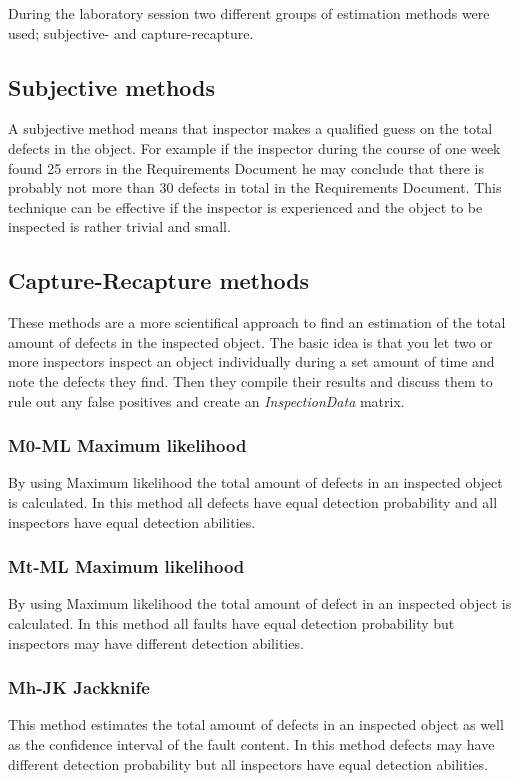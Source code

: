 During the laboratory session two different groups of estimation methods were used; subjective- and capture-recapture.

\subsection{Subjective methods}
A subjective method means that inspector makes a qualified guess on the total defects in the object. 
For example if the inspector during the course of one week found 25 errors in the Requirements Document he may conclude that there is probably not more than 30 defects in total in the Requirements Document.
This technique can be effective if the inspector is experienced and the object to be inspected is rather trivial and small.
\subsection{Capture-Recapture methods}
These methods are a more scientifical approach to find an estimation of the total amount of defects in the inspected object.
The basic idea is that you let two or more inspectors inspect an object individually during a set amount of time and note the defects they find.
Then they compile their results and discuss them to rule out any false positives and create an \textit{InspectionData} matrix.

\subsubsection{M0-ML Maximum likelihood}
By using Maximum likelihood the total amount of defects in an inspected object is calculated. 
In this method all defects have equal detection probability and all inspectors have equal detection abilities.
\subsubsection{Mt-ML Maximum likelihood}
By using Maximum likelihood the total amount of defect in an inspected object is calculated. 
In this method all faults have equal detection probability but inspectors may have different detection abilities.
\subsubsection{Mh-JK Jackknife}
This method estimates the total amount of defects in an inspected object as well as the confidence interval of the fault content. 
In this method defects may have different detection probability but all inspectors have equal detection abilities. 
